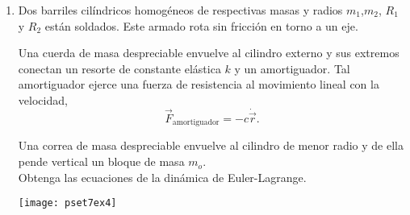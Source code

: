 \documentclass[11pt,spanish,a4paper]{article}
\begin{document}
\begin{enumerate}
\begin{minipage}[t][6cm]{0.6\textwidth}
Pregunta conceptual:
¿Cuales es la unidad de la fuerza generalizada?
\begin{tasks}(5)
	\task \si{\newton}
	\task \si{\newton \over \metre}
	\task \si{\newton \metre}
	\task Otra
\end{tasks}
Obtenga las ecuaciones de la dinámica de Euler-Lagrange. 
\end{minipage}
\begin{minipage}[c][1cm][t]{0.35\textwidth}
	\texttt{[image: pset7ex2]}
\end{minipage}



\item
\begin{minipage}[t][6cm]{0.6\textwidth}
Dos barriles cilíndricos homogéneos de respectivas masas y radios $m_1$,$m_2$, $R_1$ y $R_2$ están soldados.
Este armado rota sin fricción en torno a un eje.

Una cuerda de masa despreciable envuelve al cilindro externo y sus extremos conectan un resorte de constante elástica $k$ y un amortiguador.
Tal amortiguador ejerce una fuerza de resistencia al movimiento lineal con la velocidad,
$$
\vec{F}_\mathrm{amortiguador} = - c \dot{\vec{r}}.
$$

Una correa de masa despreciable envuelve al cilindro de menor radio y de ella pende vertical un bloque de masa $m_o$.\\
Obtenga las ecuaciones de la dinámica de Euler-Lagrange. 
\end{minipage}
\begin{minipage}[c][1cm][t]{0.35\textwidth}
	\texttt{[image: pset7ex4]}
\end{minipage}




\end{enumerate}
\end{document}
